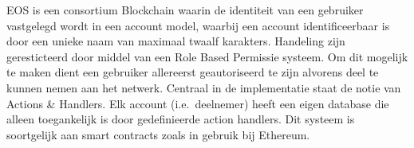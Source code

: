 EOS is een consortium Blockchain waarin de identiteit van een gebruiker vastgelegd wordt in een account model, waarbij een account identificeerbaar is door een unieke naam van maximaal twaalf karakters. Handeling zijn geresticteerd door middel van een Role Based Permissie systeem. Om dit mogelijk te maken dient een gebruiker allereerst geautoriseerd te zijn alvorens deel te kunnen nemen aan het netwerk. Centraal in de implementatie staat de notie van Actions \& Handlers. Elk account (i.e.\ deelnemer) heeft een eigen database die alleen toegankelijk is door gedefinieerde action handlers. Dit systeem is soortgelijk aan smart contracts zoals in gebruik bij Ethereum.

